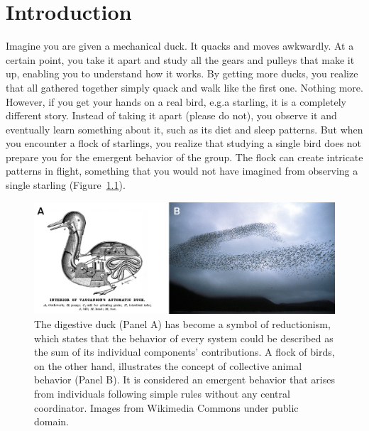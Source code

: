 \chapter{Introduction}\label{chp:intro}

Imagine you are given a mechanical duck. It quacks and moves awkwardly. At a certain point, you take it apart and study all the gears and pulleys that make it up, enabling you to understand how it works. By getting more ducks, you realize that all gathered together simply quack and walk like the first one. Nothing more. However, if you get your hands on a real bird, e.g.a starling, it is a completely different story. Instead of taking it apart (please do not), you observe it and eventually learn something about it, such as its diet and sleep patterns. But when you encounter a flock of starlings, you realize that studying a single bird does not prepare you for the emergent behavior of the group. The flock can create intricate patterns in flight, something that you would not have imagined from observing a single starling (Figure~\ref{fig:intro:duck}). \\

\begin{figure}[h]
    \centering
    \includegraphics[width=\textwidth]{figures/intro/duck_flocking.png}
    \caption[Reductionism and emergence]{The digestive duck (Panel A) has become a symbol of reductionism, which states that the behavior of every system could be described as the sum of its individual components' contributions. A flock of birds, on the other hand, illustrates the concept of collective animal behavior (Panel B). It is considered an emergent behavior that arises from individuals following simple rules without any central coordinator. Images from Wikimedia Commons under public domain.}
    \label{fig:intro:duck}
\end{figure}

